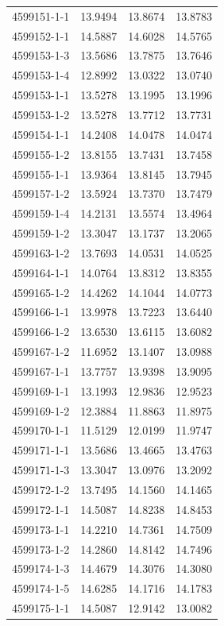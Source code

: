 \begin{longtable}{lrrr}
4599151-1-1 & 13.9494 & 13.8674 & 13.8783 \\
4599152-1-1 & 14.5887 & 14.6028 & 14.5765 \\
4599153-1-3 & 13.5686 & 13.7875 & 13.7646 \\
4599153-1-4 & 12.8992 & 13.0322 & 13.0740 \\
4599153-1-1 & 13.5278 & 13.1995 & 13.1996 \\
4599153-1-2 & 13.5278 & 13.7712 & 13.7731 \\
4599154-1-1 & 14.2408 & 14.0478 & 14.0474 \\
4599155-1-2 & 13.8155 & 13.7431 & 13.7458 \\
4599155-1-1 & 13.9364 & 13.8145 & 13.7945 \\
4599157-1-2 & 13.5924 & 13.7370 & 13.7479 \\
4599159-1-4 & 14.2131 & 13.5574 & 13.4964 \\
4599159-1-2 & 13.3047 & 13.1737 & 13.2065 \\
4599163-1-2 & 13.7693 & 14.0531 & 14.0525 \\
4599164-1-1 & 14.0764 & 13.8312 & 13.8355 \\
4599165-1-2 & 14.4262 & 14.1044 & 14.0773 \\
4599166-1-1 & 13.9978 & 13.7223 & 13.6440 \\
4599166-1-2 & 13.6530 & 13.6115 & 13.6082 \\
4599167-1-2 & 11.6952 & 13.1407 & 13.0988 \\
4599167-1-1 & 13.7757 & 13.9398 & 13.9095 \\
4599169-1-1 & 13.1993 & 12.9836 & 12.9523 \\
4599169-1-2 & 12.3884 & 11.8863 & 11.8975 \\
4599170-1-1 & 11.5129 & 12.0199 & 11.9747 \\
4599171-1-1 & 13.5686 & 13.4665 & 13.4763 \\
4599171-1-3 & 13.3047 & 13.0976 & 13.2092 \\
4599172-1-2 & 13.7495 & 14.1560 & 14.1465 \\
4599172-1-1 & 14.5087 & 14.8238 & 14.8453 \\
4599173-1-1 & 14.2210 & 14.7361 & 14.7509 \\
4599173-1-2 & 14.2860 & 14.8142 & 14.7496 \\
4599174-1-3 & 14.4679 & 14.3076 & 14.3080 \\
4599174-1-5 & 14.6285 & 14.1716 & 14.1783 \\
4599175-1-1 & 14.5087 & 12.9142 & 13.0082 \\

\end{longtable}
